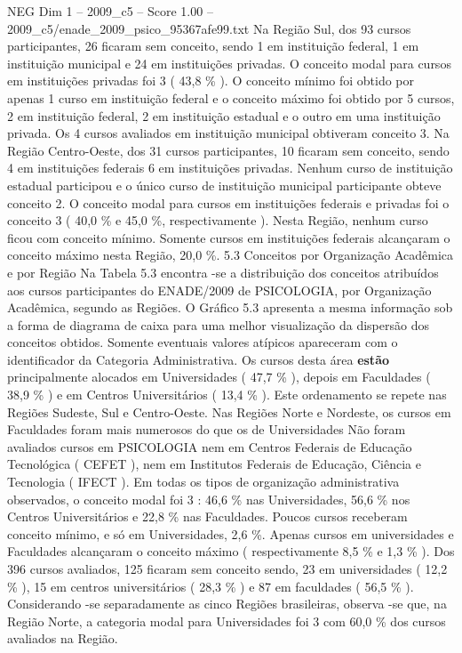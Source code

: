 \begin{textsample}{NEG Dim 1 – 2009\_c5 – Score 1.00 – 2009\_c5/enade\_2009\_psico\_95367afe99.txt}
Na Região Sul, dos 93 cursos participantes, 26 ficaram sem conceito, sendo 1 em instituição federal, 1 em instituição municipal e 24 em instituições privadas.
O conceito modal para cursos em instituições privadas foi 3 ( 43,8 \% ).
O conceito mínimo foi obtido por apenas 1 curso em instituição federal e o conceito máximo foi obtido por 5 cursos, 2 em instituição federal, 2 em instituição estadual e o outro em uma instituição privada.
Os 4 cursos avaliados em instituição municipal obtiveram conceito 3.
Na Região Centro-Oeste, dos 31 cursos participantes, 10 ficaram sem conceito, sendo 4 em instituições federais 6 em instituições privadas.
Nenhum curso de instituição estadual participou e o único curso de instituição municipal participante obteve conceito 2.
O conceito modal para cursos em instituições federais e privadas foi o conceito 3 ( 40,0 \% e 45,0 \%, respectivamente ).
Nesta Região, nenhum curso ficou com conceito mínimo.
Somente cursos em instituições federais alcançaram o conceito máximo nesta Região, 20,0 \%. 5.3 Conceitos por Organização Acadêmica e por Região Na Tabela 5.3 encontra -se a distribuição dos conceitos atribuídos aos cursos participantes do ENADE/2009 de PSICOLOGIA, por Organização Acadêmica, segundo as Regiões.
O Gráfico 5.3 apresenta a mesma informação sob a forma de diagrama de caixa para uma melhor visualização da dispersão dos conceitos obtidos.
Somente eventuais valores atípicos apareceram com o identificador da Categoria Administrativa.
Os cursos desta área \textbf{estão} principalmente alocados em Universidades ( 47,7 \% ), depois em Faculdades ( 38,9 \% ) e em Centros Universitários ( 13,4 \% ).
Este ordenamento se repete nas Regiões Sudeste, Sul e Centro-Oeste.
Nas Regiões Norte e Nordeste, os cursos em Faculdades foram mais numerosos do que os de Universidades Não foram avaliados cursos em PSICOLOGIA nem em Centros Federais de Educação Tecnológica ( CEFET ), nem em Institutos Federais de Educação, Ciência e Tecnologia ( IFECT ).
Em todas os tipos de organização administrativa observados, o conceito modal foi 3 : 46,6 \% nas Universidades, 56,6 \% nos Centros Universitários e 22,8 \% nas Faculdades.
Poucos cursos receberam conceito mínimo, e só em Universidades, 2,6 \%.
Apenas cursos em universidades e Faculdades alcançaram o conceito máximo ( respectivamente 8,5 \% e 1,3 \% ).
Dos 396 cursos avaliados, 125 ficaram sem conceito sendo, 23 em universidades ( 12,2 \% ), 15 em centros universitários ( 28,3 \% ) e 87 em faculdades ( 56,5 \% ).
Considerando -se separadamente as cinco Regiões brasileiras, observa -se que, na Região Norte, a categoria modal para Universidades foi 3 com 60,0 \% dos cursos avaliados na Região.

\end{textsample}
